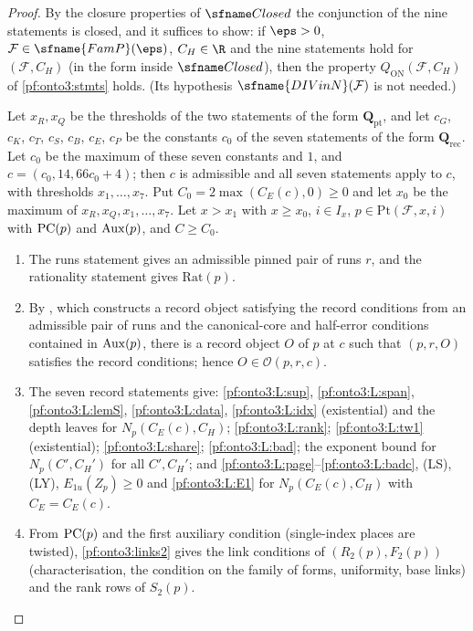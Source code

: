 \begin{proof}
By the closure properties of $\ontothreeClosed$ the conjunction of the nine statements is closed, and it suffices
to show: if $\eps>0$, $\mathcal F\in\sfname{FamP}(\eps)$, $C_H\in\R$ and the nine statements hold for
$(\mathcal F,C_H)$ (in the form inside $\ontothreeClosed$), then the property $Q_{\mathrm{ON}}(\mathcal F,C_H)$ of
\cref{pf:onto3:stmts} holds. (Its hypothesis $\sfname{DIVinN}(\mathcal F)$ is not needed.)

Let $x_R,x_Q$ be the thresholds of the two statements of the form $\mathbf Q_{\mathrm{pt}}$, and let $c_G$, $c_K$,
$c_T$, $c_S$, $c_B$, $c_E$, $c_P$ be the constants $c_0$ of the seven statements of the form $\mathbf Q_{\mathrm{rec}}$.
Let $c_0$ be the maximum of these seven constants and $1$, and $c=(c_0,14,66c_0+4)$; then $c$ is admissible and all
seven statements apply to $c$, with thresholds $x_1,\dots,x_7$. Put $C_0=2\max(C_E(c),0)\ge0$ and let $x_0$ be the
maximum of $x_R,x_Q,x_1,\dots,x_7$. Let $x>x_1$ with $x\ge x_0$, $i\in I_x$, $p\in\mathrm{Pt}(\mathcal F,x,i)$ with
$\mathrm{PC}(p)$ and $\mathrm{Aux}(p)$, and $C\ge C_0$.
\begin{enumerate}[label=(\arabic*)]
\item The runs statement gives an admissible pinned pair of runs $r$, and the rationality statement gives
$\mathrm{Rat}(p)$.
\item By , which constructs a record object satisfying the record
conditions from an admissible pair of runs and the canonical-core and half-error conditions contained in
$\mathrm{Aux}(p)$, there is a record object $O$ of $p$ at $c$ such that $(p,r,O)$ satisfies the record
conditions; hence $O\in\mathcal O(p,r,c)$.
\item The seven record statements give: \ref{pf:onto3:L:sup}, \ref{pf:onto3:L:span}, \ref{pf:onto3:L:lemS},
\ref{pf:onto3:L:data}, \ref{pf:onto3:L:idx} (existential) and the depth leaves for $N_p(C_E(c),C_H)$;
\ref{pf:onto3:L:rank}; \ref{pf:onto3:L:tw1} (existential); \ref{pf:onto3:L:share}; \ref{pf:onto3:L:bad}; the
exponent bound for $N_p(C',C_H')$ for all $C',C_H'$; and \ref{pf:onto3:L:page}--\ref{pf:onto3:L:badc}, (LS), (LY),
$E_{1u}(Z_p)\ge0$ and \ref{pf:onto3:L:E1} for $N_p(C_E(c),C_H)$ with $C_E=C_E(c)$.
\item From $\mathrm{PC}(p)$ and the first auxiliary condition (single-index places are twisted),
\cref{pf:onto3:links2} gives the link conditions of $(R_2(p),F_2(p))$
(characterisation, the condition on the family of forms, uniformity, base links) and the rank rows of $S_2(p)$.

\end{enumerate}
\end{proof}
